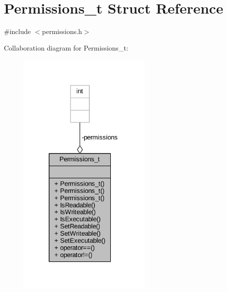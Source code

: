 \hypertarget{struct_permissions__t}{}\section{Permissions\+\_\+t Struct Reference}
\label{struct_permissions__t}


{\ttfamily \#include $<$permissions.\+h$>$}



Collaboration diagram for Permissions\+\_\+t\+:
\nopagebreak
\begin{figure}[H]
\begin{center}
\leavevmode
\includegraphics[width=187pt]{struct_permissions__t__coll__graph}
\end{center}
\end{figure}
